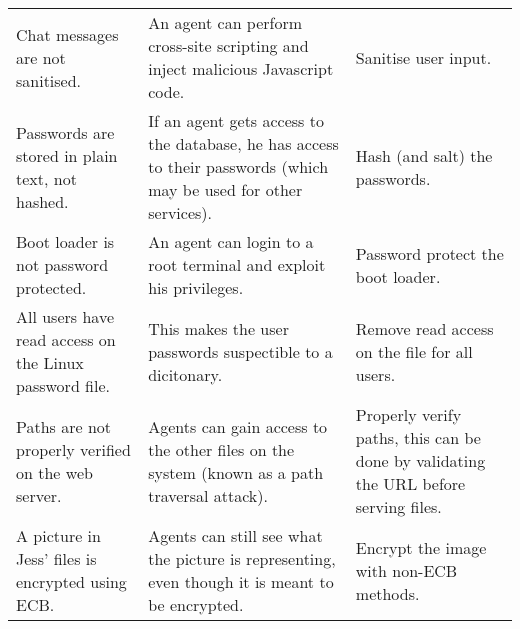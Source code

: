 \documentclass[a4paper]{article}
\begin{document}
\begin{longtable}{p{} p{} p{}}
    Chat messages are not sanitised. &
    An agent can perform cross-site scripting and inject malicious Javascript code. &
    Sanitise user input. \\
    \addlinespace

    Passwords are stored in plain text, not hashed. & 
    If an agent gets access to the database, he has access to their passwords (which may be used for other services). &
    Hash (and salt) the passwords. \\
    \addlinespace

    Boot loader is not password protected. &
    An agent can login to a root terminal and exploit his privileges. &
    Password protect the boot loader. \\
    \addlinespace

    All users have read access on the Linux password file. & 
    This makes the user passwords suspectible to a dicitonary. &
    Remove read access on the file for all users. \\
    \addlinespace

    Paths are not properly verified on the web server. &
    Agents can gain access to the other files on the system (known as a path traversal attack). &
    Properly verify paths, this can be done by validating the URL before serving files. \\
    \addlinespace

    A picture in Jess' files is encrypted using ECB. &
    Agents can still see what the picture is representing, even though it is meant to be encrypted. & 
    Encrypt the image with non-ECB methods. \\
    \bottomrule
\end{longtable}
\end{document}
